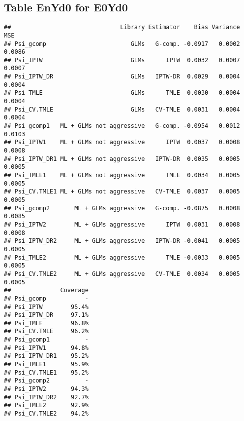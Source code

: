 \documentclass[11pt]{article}\usepackage[]{graphicx}\usepackage[]{color}
\makeatletter
\newenvironment{kframe}{%
 \def\at@end@of@kframe{}%
 \ifinner\ifhmode%
  \def\at@end@of@kframe{\end{minipage}}%
  \begin{minipage}{\columnwidth}%
 \fi\fi%
 \def\FrameCommand##1{\hskip\@totalleftmargin \hskip-\fboxsep
 \colorbox{shadecolor}{##1}\hskip-\fboxsep
     \hskip-\linewidth \hskip-\@totalleftmargin \hskip\columnwidth}%
 \MakeFramed {\advance\hsize-\width
   \@totalleftmargin\z@ \linewidth\hsize
   \@setminipage}}%
 {\par\unskip\endMakeFramed%
 \at@end@of@kframe}
\newenvironment{knitrout}{}{} %
\makeatother
\begin{document}
\subsection{Table EnYd0 for E0Yd0}
\begin{knitrout}
\color{fgcolor}\begin{kframe}
\begin{verbatim}
##                               Library Estimator    Bias Variance    MSE
## Psi_gcomp                        GLMs   G-comp. -0.0917   0.0002 0.0086
## Psi_IPTW                         GLMs      IPTW  0.0032   0.0007 0.0007
## Psi_IPTW_DR                      GLMs   IPTW-DR  0.0029   0.0004 0.0004
## Psi_TMLE                         GLMs      TMLE  0.0030   0.0004 0.0004
## Psi_CV.TMLE                      GLMs   CV-TMLE  0.0031   0.0004 0.0004
## Psi_gcomp1   ML + GLMs not aggressive   G-comp. -0.0954   0.0012 0.0103
## Psi_IPTW1    ML + GLMs not aggressive      IPTW  0.0037   0.0008 0.0008
## Psi_IPTW_DR1 ML + GLMs not aggressive   IPTW-DR  0.0035   0.0005 0.0005
## Psi_TMLE1    ML + GLMs not aggressive      TMLE  0.0034   0.0005 0.0005
## Psi_CV.TMLE1 ML + GLMs not aggressive   CV-TMLE  0.0037   0.0005 0.0005
## Psi_gcomp2       ML + GLMs aggressive   G-comp. -0.0875   0.0008 0.0085
## Psi_IPTW2        ML + GLMs aggressive      IPTW  0.0031   0.0008 0.0008
## Psi_IPTW_DR2     ML + GLMs aggressive   IPTW-DR -0.0041   0.0005 0.0005
## Psi_TMLE2        ML + GLMs aggressive      TMLE -0.0033   0.0005 0.0005
## Psi_CV.TMLE2     ML + GLMs aggressive   CV-TMLE  0.0034   0.0005 0.0005
##              Coverage
## Psi_gcomp           -
## Psi_IPTW        95.4%
## Psi_IPTW_DR     97.1%
## Psi_TMLE        96.8%
## Psi_CV.TMLE     96.2%
## Psi_gcomp1          -
## Psi_IPTW1       94.8%
## Psi_IPTW_DR1    95.2%
## Psi_TMLE1       95.9%
## Psi_CV.TMLE1    95.2%
## Psi_gcomp2          -
## Psi_IPTW2       94.3%
## Psi_IPTW_DR2    92.7%
## Psi_TMLE2       92.9%
## Psi_CV.TMLE2    94.2%
\end{verbatim}
\end{kframe}
\end{knitrout}
\end{document}
